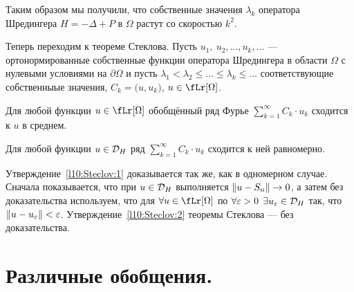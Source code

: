 Таким образом мы получили, что собственные значения $\lambda_k$ оператора Шредингера $H=-\Delta+P$ в $\Omega$ растут со скоростью $k^2$. 

Теперь переходим к теореме Стеклова. Пусть $u_1,\ u_2,\ldots,u_k,\ldots$ --- ортонормированные собственные функции оператора Шредингера в области $\Omega$ с нулевыми условиями на $\partial\Omega$ и пусть $\lambda_1<\lambda_2\leqslant\ldots\leqslant\lambda_k\leqslant\ldots$ соответствующие собственныые значения, $C_k=\big(u,u_k\big)$, $u\in\fLr[\Omega]$. 
\begin{_teor}[Стеклова]\hfill
	\begin{enumerate1}
		\item\label{l10:Steclov:1} Для любой функции $u\in\fLr[\Omega]$ обобщённый ряд Фурье $\displaystyle\sum\limits_{k=1}^{\infty}C_k\cdot u_k$ сходится к $u$ в среднем.
		\item\label{l10:Steclov:2} Для любой функции $u\in\mathcal{D}_{H}$ ряд  $\displaystyle\sum\limits_{k=1}^{\infty}C_k\cdot u_k$ сходится к ней равномерно.
	\end{enumerate1}
\end{_teor}
Утверждение~\ref{l10:Steclov:1} доказывается так же, как в одномерном случае. Сначала показывается, что при $u\in\mathcal{D}_H$ выполняется $\left\|u-S_n\right\|\to0$, а затем без доказательства используем, что для $\forall u\in\fLr[\Omega]$ по $\forall\varepsilon>0$ $\exists u_{\varepsilon}\in\mathcal{D}_H$ так, что $\left\|u-u_{\varepsilon}\right\|<\varepsilon$. Утверждение~\ref{l10:Steclov:2} теоремы Стеклова --- без доказательства.

\section{Различные обобщения.}
\label{lecture10section2}
